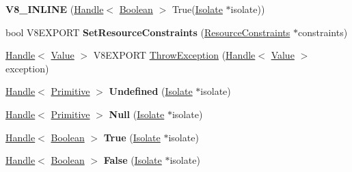 \begin{DoxyCompactItemize}
\item 
\hypertarget{namespacev8_a02cdac056bdf3209a4f65a2c1b36c84e}{}{\bfseries V8\+\_\+\+I\+N\+L\+I\+N\+E} (\hyperlink{classv8_1_1_handle}{Handle}$<$ \hyperlink{classv8_1_1_boolean}{Boolean} $>$ True(\hyperlink{classv8_1_1_isolate}{Isolate} $\ast$isolate))\label{namespacev8_a02cdac056bdf3209a4f65a2c1b36c84e}

\item 
\hypertarget{namespacev8_a6a08a0e1cf070f360fc8ea2834737039}{}bool V8\+E\+X\+P\+O\+R\+T {\bfseries Set\+Resource\+Constraints} (\hyperlink{classv8_1_1_resource_constraints}{Resource\+Constraints} $\ast$constraints)\label{namespacev8_a6a08a0e1cf070f360fc8ea2834737039}

\item 
\hyperlink{classv8_1_1_handle}{Handle}$<$ \hyperlink{classv8_1_1_value}{Value} $>$ V8\+E\+X\+P\+O\+R\+T \hyperlink{namespacev8_a2469af0ac719d39f77f20cf68dd9200e}{Throw\+Exception} (\hyperlink{classv8_1_1_handle}{Handle}$<$ \hyperlink{classv8_1_1_value}{Value} $>$ exception)
\item 
\hypertarget{namespacev8_afb8da2090c9df2efcff83f45a29cafcc}{}\hyperlink{classv8_1_1_handle}{Handle}$<$ \hyperlink{classv8_1_1_primitive}{Primitive} $>$ {\bfseries Undefined} (\hyperlink{classv8_1_1_isolate}{Isolate} $\ast$isolate)\label{namespacev8_afb8da2090c9df2efcff83f45a29cafcc}

\item 
\hypertarget{namespacev8_a8d15931bac5ad36b465bdde2bbafc94d}{}\hyperlink{classv8_1_1_handle}{Handle}$<$ \hyperlink{classv8_1_1_primitive}{Primitive} $>$ {\bfseries Null} (\hyperlink{classv8_1_1_isolate}{Isolate} $\ast$isolate)\label{namespacev8_a8d15931bac5ad36b465bdde2bbafc94d}

\item 
\hypertarget{namespacev8_a0a5228b881dd903b64da2212573d64b0}{}\hyperlink{classv8_1_1_handle}{Handle}$<$ \hyperlink{classv8_1_1_boolean}{Boolean} $>$ {\bfseries True} (\hyperlink{classv8_1_1_isolate}{Isolate} $\ast$isolate)\label{namespacev8_a0a5228b881dd903b64da2212573d64b0}

\item 
\hypertarget{namespacev8_ab0857355b0507a1536843ac4065660d2}{}\hyperlink{classv8_1_1_handle}{Handle}$<$ \hyperlink{classv8_1_1_boolean}{Boolean} $>$ {\bfseries False} (\hyperlink{classv8_1_1_isolate}{Isolate} $\ast$isolate)\label{namespacev8_ab0857355b0507a1536843ac4065660d2}

\end{DoxyCompactItemize}


